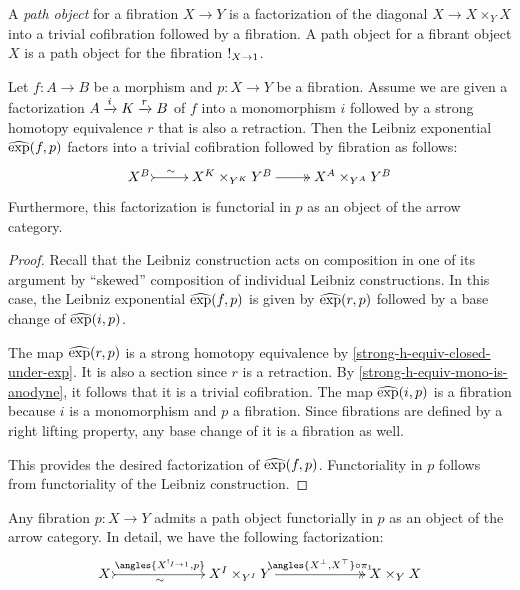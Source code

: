 \documentclass[reqno,10pt,a4paper,oneside]{amsart}
\begin{document}
A \emph{path object} for a fibration $X \to Y$ is a factorization of the diagonal $X \to X \times_Y X$ into a trivial cofibration followed by a fibration.
A path object for a fibrant object $X$ is a path object for the fibration $\mathord{!}_{X \to 1}$.

\begin{lemma}
\label{leibniz-exp-factorization}
Let $f : A \to B$ be a morphism and $p : X \to Y$ be a fibration.
Assume we are given a factorization $A \xrightarrow{i} K \xrightarrow{r} B$ of $f$ into a monomorphism $i$ followed by a strong homotopy equivalence $r$ that is also a retraction.
Then the Leibniz exponential $\operatorname{\widehat{exp}}(f, p)$ factors into a trivial cofibration followed by fibration as follows:
\[
\xymatrix{
  X^B
  \ar@{>->}[r]^-{\sim}
&
  X^K \times_{Y^K} Y^B
  \ar@{->>}[r]
&
  X^A \times_{Y^A} Y^B
}
\]
Furthermore, this factorization is functorial in $p$ as an object of the arrow category.
\end{lemma}

\begin{proof}
Recall that the Leibniz construction acts on composition in one of its argument by ``skewed'' composition of individual Leibniz constructions.
In this case, the Leibniz exponential $\operatorname{\widehat{exp}}(f, p)$ is given by $\operatorname{\widehat{exp}}(r, p)$ followed by a base change of $\operatorname{\widehat{exp}}(i, p)$.

The map $\operatorname{\widehat{exp}}(r, p)$ is a strong homotopy equivalence by \cref{strong-h-equiv-closed-under-exp}.
It is also a section since $r$ is a retraction.
By \cref{strong-h-equiv-mono-is-anodyne}, it follows that it is a trivial cofibration.
The map $\operatorname{\widehat{exp}}(i, p)$ is a fibration because $i$ is a monomorphism and $p$ a fibration.
Since fibrations are defined by a right lifting property, any base change of it is a fibration as well.

This provides the desired factorization of $\operatorname{\widehat{exp}}(f, p)$.
Functoriality in $p$ follows from functoriality of the Leibniz construction.
\end{proof}

\begin{proposition}
\label{path-objects}
Any fibration $p : X \to Y$ admits a path object functorially in $p$ as an object of the arrow category.
In detail, we have the following factorization:
\[
\xymatrix@C+4em{
  X
  \ar@{>->}[r]_-{\sim}^-{\angles{X^{\canonical_{I \to 1}}, p}}
&
  X^I \times_{Y^I} Y
  \ar@{->>}[r]^-{\angles{X^{\bot}, X^{\top}} \cc \pi_1}
&
  X \times_Y X
}
\]
\end{proposition}
\end{document}
